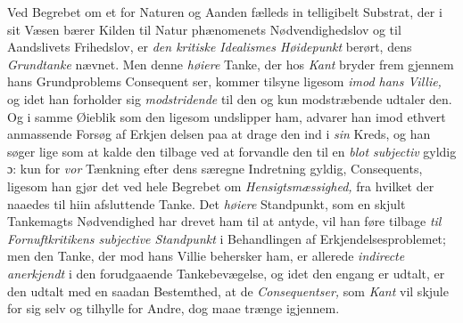 Ved Begrebet om et for Naturen og Aanden fælleds in\-%
telligibelt Substrat, der i sit Væsen bærer Kilden til Natur\-%
phænomenets Nødvendighedslov og til Aandslivets Frihedslov,
er \emph{den kritiske Idealismes Høidepunkt} berørt, dens
\emph{Grundtanke} nævnet. Men denne \emph{høiere} Tanke, der hos
\emph{Kant} bryder frem gjennem hans Grundproblems Consequent\-%
ser, kommer tilsyne ligesom \emph{imod hans Villie,} og idet han
forholder sig \emph{modstridende} til den og kun modstræbende
udtaler den. Og i samme Øieblik som den ligesom undslipper
ham, advarer han imod ethvert anmassende Forsøg af Erkjen\-%
delsen paa at drage den ind i \emph{sin} Kreds, og han søger lige\-%
som at kalde den tilbage ved at forvandle den til en \emph{blot
subjectiv} gyldig ɔ: kun for \emph{vor} Tænkning efter dens særegne
 \setcounter{footnote}{0}%
Indretning gyldig, Consequents, ligesom han gjør det ved hele
Begrebet om \emph{Hensigtsmæssighed,} fra hvilket der naaedes
til hiin afsluttende Tanke. Det \emph{høiere} Standpunkt, som en
skjult Tankemagts Nødvendighed har drevet ham til at antyde,
vil han føre tilbage \emph{til Fornuftkritikens subjective
Standpunkt} i Behandlingen af Erkjendelsesproblemet; men
den Tanke, der mod hans Villie behersker ham, er allerede
\emph{indirecte anerkjendt} i den forudgaaende Tankebevægelse,
og idet den engang er udtalt, er den udtalt med en saadan
Bestemthed, at de \emph{Consequentser,} som \emph{Kant} vil skjule for
sig selv og tilhylle for Andre, dog maae trænge igjennem.

